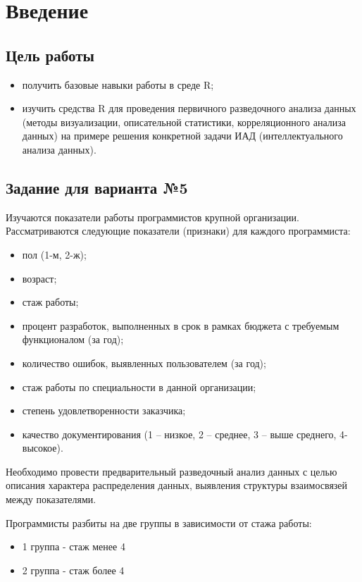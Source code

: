 \chapter{Введение}

\section{Цель работы}

\begin{itemize}
	\item получить базовые навыки работы в среде R;
	\item изучить средства R для проведения первичного разведочного анализа данных (методы визуализации, описательной статистики, корреляционного анализа данных) на примере решения конкретной задачи ИАД (интеллектуального анализа данных).
\end{itemize}


\section{Задание для варианта №5}
Изучаются показатели работы программистов крупной организации. Рассматриваются следующие показатели (признаки) для каждого программиста:

\begin{itemize}
	\item пол (1-м, 2-ж);
	\item возраст;
	\item стаж работы;
	\item процент разработок, выполненных в срок в рамках бюджета с требуемым функционалом (за год);
	\item количество ошибок, выявленных пользователем (за год);
	\item стаж работы по специальности в данной организации;
	\item степень удовлетворенности заказчика;
	\item качество документирования (1 – низкое, 2 – среднее, 3 – выше среднего, 4- высокое).
\end{itemize}

Необходимо провести предварительный разведочный анализ данных с целью описания характера распределения данных, выявления структуры взаимосвязей между показателями.

Программисты разбиты на две группы в зависимости от стажа работы:

\begin{itemize}
	\item 1 группа - стаж менее 4
	\item 2 группа - стаж более 4
\end{itemize}